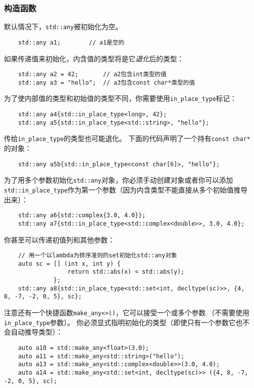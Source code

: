 \subsubsection{构造函数}
默认情况下，\texttt{std::any}被初始化为空。
\begin{lstlisting}
    std::any a1;        // a1是空的
\end{lstlisting}
如果传递值来初始化，内含值的类型将是它\emph{退化}后的类型：
\begin{lstlisting}
    std::any a2 = 42;       // a2包含int类型的值
    std::any a3 = "hello";  // a3包含const char*类型的值
\end{lstlisting}
为了使内部值的类型和初始值的类型不同，你需要使用\texttt{in\_place\_type}标记：
\begin{lstlisting}
    std::any a4{std::in_place_type<long>, 42};
    std::any a5{std::in_place_type<std::string>, "hello"};
\end{lstlisting}
传给\texttt{in\_place\_type}的类型也可能退化。
下面的代码声明了一个持有\texttt{const char*}的对象：
\begin{lstlisting}
    std::any a5b{std::in_place_type<const char[6]>, "hello"};
\end{lstlisting}
为了用多个参数初始化\texttt{std::any}对象，你必须手动创建对象或者你可以添加
\texttt{std::in\_place\_type}作为第一个参数（因为内含类型不能直接从多个初始值推导出来）：
\begin{lstlisting}
    std::any a6{std::complex{3.0, 4.0}};
    std::any a7{std::in_place_type<std::complex<double>>, 3.0, 4.0};
\end{lstlisting}
你甚至可以传递初值列和其他参数：
\begin{lstlisting}
    // 用一个以lambda为排序准则的set初始化std::any对象
    auto sc = [] (int x, int y) {
                  return std::abs(x) < std::abs(y);
              };
    std::any a8{std::in_place_type<std::set<int, decltype(sc)>>, {4, 8, -7, -2, 0, 5}, sc};
\end{lstlisting}
注意还有一个快捷函数\texttt{make\_any<>()}，它可以接受一个或多个参数
（不需要使用\texttt{in\_place\_type}参数）。
你必须显式指明初始化的类型（即使只有一个参数它也不会自动推导类型）：
\begin{lstlisting}
    auto a10 = std::make_any<float>(3.0);
    auto a11 = std::make_any<std::string>("hello");
    auto a13 = std::make_any<std::complex<double>>(3.0, 4.0);
    auto a14 = std::make_any<std::set<int, decltype(sc)>> ({4, 8, -7, -2, 0, 5}, sc);
\end{lstlisting}

